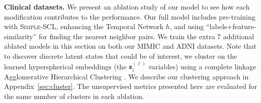 \documentclass[pmlr,twocolumn,10pt]{jmlr} %
\begin{document}
\vspace{.2em}
\noindent
\textbf{Clinical datasets.} We present an ablation study of our model to see how each modification contributes to the performance.
Our full model includes pre-training with \textsc{Simple-SCL}, enhancing the Temporal Network $h$, and using ``labels$+$feature-similarity'' for finding the nearest neighbor pairs. 
We train the extra 7 additional ablated models in this section on both our MIMIC and ADNI datasets.
Note that to discover discrete latent states that could be of interest, we cluster on the learned hyperspherical embeddings (the $\mathbf{z}_i^{(\ell)}$ variables)  using a complete linkage Agglomerative Hierarchical Clustering \citep{murtagh2012algorithms}. We describe our clustering approach in Appendix~\ref{sec:cluster}. The unsupervised metrics presented here are evaluated for the same number of clusters in each ablation.
\end{document}
